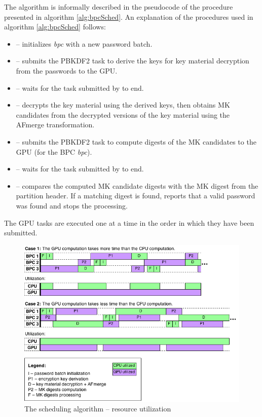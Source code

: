 \documentclass[12pt,oneside]{fithesis2}
\begin{document}
      The algorithm is informally described in the pseudocode of the  procedure presented in algorithm \ref{alg:bpcSched}. An explanation of the procedures used in algorithm \ref{alg:bpcSched} follows:
      \begin{itemize}
        \item {} -- initializes \emph{bpc} with a new password batch.
        \item {} -- submits the PBKDF2 task to derive the keys for key material decryption from the passwords to the GPU.
        \item {} -- waits for the task submitted by  to end.
        \item {} -- decrypts the key material using the derived keys, then obtains MK candidates from the decrypted versions of the key material using the AFmerge transformation.
        \item {} -- submits the PBKDF2 task to compute digests of the MK candidates to the GPU (for the BPC \emph{bpc}).
        \item {} -- waits for the task submitted by  to end.
        \item {} -- compares the computed MK candidate digests with the MK digest from the partition header. If a matching digest is found, reports that a valid password was found and stops the processing.
      \end{itemize}
      
      The GPU tasks are executed one at a time in the order in which they have been submitted.
      
      \begin{figure}[H]
        \centering
        \includegraphics[width=\linewidth]{images/scheduling.png}
        \caption{The scheduling algorithm -- resource utilization}
        \label{fig:scheduling}
      \end{figure}
      
\end{document}
